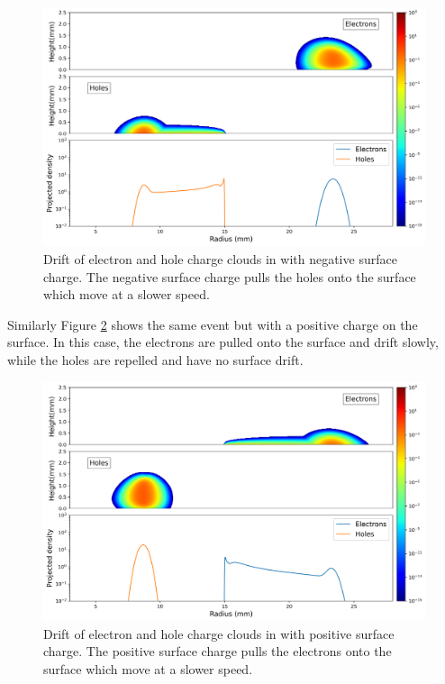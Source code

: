 \begin{figure}%
    \includegraphics[trim={0cm 0 0cm 0},clip,width=0.99\linewidth]{ch3/figs/drift_path_sc=-0.3.png}
    \caption{Drift of electron and hole charge clouds in {\ehd} with negative surface charge. The negative surface charge pulls the holes onto the surface which move at a slower speed.}
    \label{ch3_fig_ehd_path_pd_sc_neg_0p3}
\end{figure}

Similarly Figure \ref{ch3_fig_ehd_path_pd_sc_pos_0p3} shows the same event but with a positive charge on the surface. In this case, the electrons are pulled onto the surface and drift slowly, while the holes are repelled and have no surface drift. 

\begin{figure}%
    \includegraphics[trim={0cm 0 0cm 0},clip,width=0.99\linewidth]{ch3/figs/drift_path_sc=0.3.png}
    \caption{Drift of electron and hole charge clouds in {\ehd} with positive surface charge. The positive surface charge pulls the electrons onto the surface which move at a slower speed.}
    \label{ch3_fig_ehd_path_pd_sc_pos_0p3}
\end{figure}


